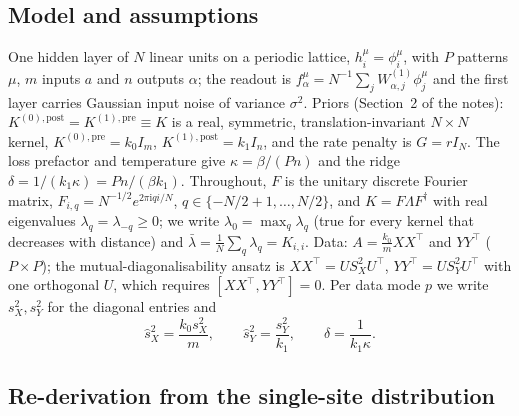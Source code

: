 \documentclass[11pt,a4paper]{article}
\newcommand{\sX}{\hat s_X^2}
\newcommand{\sY}{\hat s_Y^2}
\theoremstyle{remark}
\begin{document}
\subsection{Model and assumptions}
One hidden layer of $N$ linear units on a periodic lattice, $h^{\mu}_i = \phi^{\mu}_i$, with $P$ patterns $\mu$, $m$ inputs $a$ and $n$ outputs $\alpha$; the readout is $f^\mu_\alpha = N^{-1}\sum_j W^{(1)}_{\alpha,j}\phi^\mu_j$ and the first layer carries Gaussian input noise of variance $\sigma^2$.
Priors (Section~2 of the notes): $K^{(0),\mathrm{post}} = K^{(1),\mathrm{pre}} \equiv K$ is a real, symmetric, translation-invariant $N\times N$ kernel, $K^{(0),\mathrm{pre}} = k_0 I_m$, $K^{(1),\mathrm{post}} = k_1 I_n$, and the rate penalty is $G = r I_N$. The loss prefactor and temperature give $\kappa = \beta/(Pn)$ and the ridge $\delta = 1/(k_1\kappa) = Pn/(\beta k_1)$.
Throughout, $F$ is the unitary discrete Fourier matrix, $F_{i,q} = N^{-1/2} e^{2\pi \mathrm i q i/N}$, $q \in \{-N/2+1,\dots,N/2\}$, and $K = F\Lambda F^\dagger$ with real eigenvalues $\lambda_q = \lambda_{-q} \ge 0$; we write $\lambda_0 = \max_q \lambda_q$ (true for every kernel that decreases with distance) and $\bar\lambda = \frac1N\sum_q\lambda_q = K_{i,i}$.
Data: $A = \frac{k_0}{m} XX^\top$ and $YY^\top$ ($P\times P$); the mutual-diagonalisability ansatz is $XX^\top = U S_X^2 U^\top$, $YY^\top = U S_Y^2 U^\top$ with one orthogonal $U$, which requires $[XX^\top, YY^\top] = 0$. Per data mode $p$ we write $s_X^2, s_Y^2$ for the diagonal entries and
\begin{equation}
  \sX = \frac{k_0 s_X^2}{m}, \qquad \sY = \frac{s_Y^2}{k_1}, \qquad \delta = \frac{1}{k_1\kappa} .
\end{equation}

\subsection{Re-derivation from the single-site distribution}
\label{sec:rederive}
\end{document}
